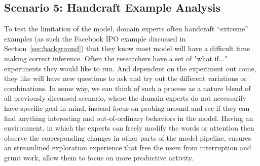 \subsection{Scenario 5: Handcraft Example Analysis}
To test the limitation of the model, domain experts often handcraft ``extreme'' examples (as such the Facebook IPO example discussed in Section~\ref{sec:background}) that they know most model will have a difficult time making correct inference. 
%
Often the researchers have a set of "what if..." experiments they would like to run. And dependent on the experiment out come, they like will have new questions to ask and try out the different variations or combinations.
%
In some way, we can think of such a process as a nature blend of all previously discussed scenario, where the domain experts do not necessarily have specific goal in mind, instead focus on probing around and see if they can find anything interesting and out-of-ordinary behaviors in the model.
%
Having an environment, in which the experts can freely modify the words or attention then observe the corresponding changes in other parts of the model pipeline, ensures an streamlined exploration experience that free the users from interruption and grunt work, allow them to focus on more productive activity. 

